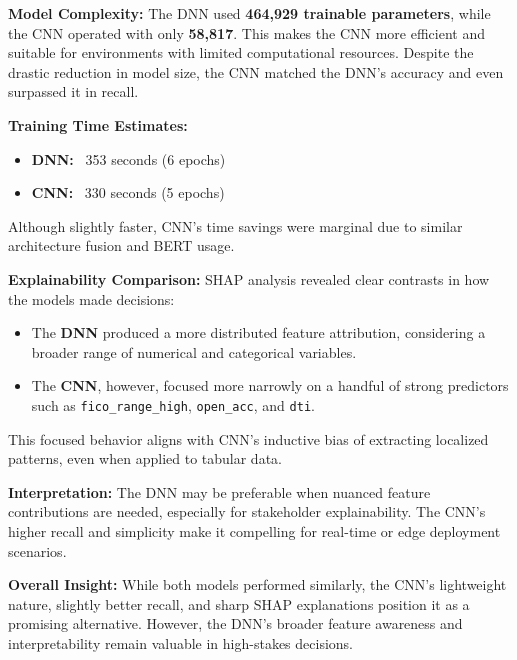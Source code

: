 \textbf{Model Complexity:}  
The DNN used \textbf{464,929 trainable parameters}, while the CNN operated with only \textbf{58,817}. This makes the CNN more efficient and suitable for environments with limited computational resources. Despite the drastic reduction in model size, the CNN matched the DNN’s accuracy and even surpassed it in recall.

\vspace{0.5em}
\vspace{1cm}
\textbf{Training Time Estimates:}
\begin{itemize}
    \item \textbf{DNN:} ~353 seconds (6 epochs)
    \item \textbf{CNN:} ~330 seconds (5 epochs)
\end{itemize}
Although slightly faster, CNN's time savings were marginal due to similar architecture fusion and BERT usage.

\textbf{Explainability Comparison:}  
SHAP analysis revealed clear contrasts in how the models made decisions:
\begin{itemize}
    \item The \textbf{DNN} produced a more distributed feature attribution, considering a broader range of numerical and categorical variables.
    \item The \textbf{CNN}, however, focused more narrowly on a handful of strong predictors such as \texttt{fico\_range\_high}, \texttt{open\_acc}, and \texttt{dti}.
\end{itemize}
This focused behavior aligns with CNN’s inductive bias of extracting localized patterns, even when applied to tabular data.

\textbf{Interpretation:}  
The DNN may be preferable when nuanced feature contributions are needed, especially for stakeholder explainability. The CNN’s higher recall and simplicity make it compelling for real-time or edge deployment scenarios.

\textbf{Overall Insight:}  
While both models performed similarly, the CNN’s lightweight nature, slightly better recall, and sharp SHAP explanations position it as a promising alternative. However, the DNN’s broader feature awareness and interpretability remain valuable in high-stakes decisions.